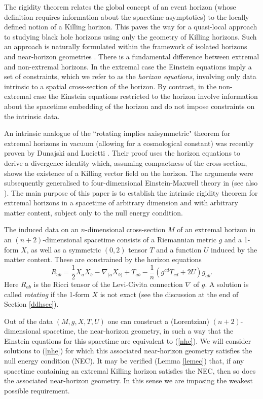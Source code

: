 \documentclass[11pt, reqno]{amsart}
\theoremstyle{plain}
\theoremstyle{definition}
\numberwithin{equation}{section}
\begin{document}
The rigidity theorem relates the global concept of an event horizon (whose definition requires information about the spacetime asymptotics) to the locally defined notion of a Killing horizon. This paves the way for a quasi-local approach to studying black hole horizons using only the geometry of Killing horizons. Such an approach is naturally formulated within the framework of isolated horizons \cite{ABC98, ABL02, LP02, LP05} and near-horizon geometries \cite{R02, KL13}. There is a fundamental difference between extremal and non-extremal horizons. In the extremal case the Einstein equations imply a set of constraints, which we refer to as the \textit{horizon equations}, involving only data intrinsic to a spatial cross-section of the horizon. By contrast, in the non-extremal case the Einstein equations restricted to the horizon involve information about the spacetime embedding of the horizon and do not impose constraints on the intrinsic data.

An intrinsic analogue of the ``rotating implies axisymmetric" theorem for extremal horizons in vacuum (allowing for a cosmological constant) was recently proven by Dunajski and Lucietti \cite{DL}. Their proof uses the horizon equations to derive a divergence identity which, assuming compactness of the cross-section, shows the existence of a Killing vector field on the horizon. The arguments were subsequently generalised to four-dimensional Einstein-Maxwell theory in \cite{CKL} (see also \cite{KL24}). The main purpose of this paper is to establish the intrinsic rigidity theorem for extremal horizons in a spacetime of arbitrary dimension and with arbitrary matter content, subject only to the null energy condition.

The induced data on an $n$-dimensional cross-section $M$ of an extremal horizon in an $(n+2)$-dimensional spacetime consists of a Riemannian metric $g$ and a 1-form $X$, as well as a symmetric $(0,2)$ tensor $T$ and a function $U$ induced by the matter content. These are constrained by the horizon equations \cite{KL13}
\begin{equation} \label{nhe}
    R_{ab} = \frac 12X_aX_b - \nabla_{(a}X_{b)} + T_{ab} - \frac 1n(g^{cd}T_{cd} + 2U)g_{ab}.
\end{equation}
Here $R_{ab}$ is the Ricci tensor of the Levi-Civita connection $\nabla$ of $g$. A solution is called \textit{rotating} if the 1-form $X$ is not exact (see the discussion at the end of Section \ref{ddhsec}). 

Out of the data $(M,g,X,T,U)$ one can construct a (Lorentzian) $(n+2)$-dimensional spacetime, the near-horizon geometry, in such a way that the Einstein equations for this spacetime are equivalent to (\ref{nhe}). We will consider solutions to (\ref{nhe}) for which this associated near-horizon geometry satisfies the null energy condition (NEC). It may be verified (Lemma \ref{lemec}) that, if any spacetime containing an extremal Killing horizon satisfies the NEC, then so does the associated near-horizon geometry. In this sense we are imposing the weakest possible requirement.
\end{document}
